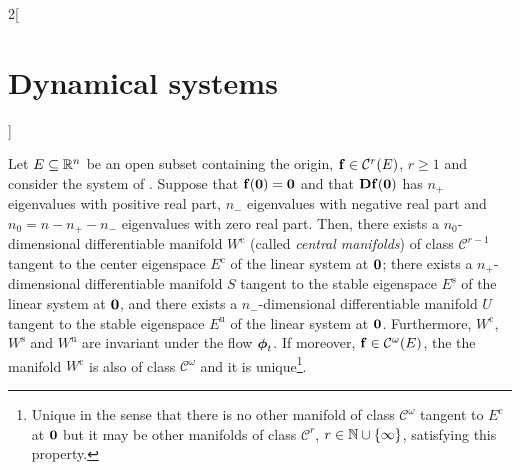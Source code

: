 \documentclass[../../../main_math.tex]{subfiles}
\begin{document}
\begin{multicols}{2}[\section{Dynamical systems}]
\begin{theorem}
    Let $E\subseteq\mathbb{R}^n$ be an open subset containing the origin, $\boldsymbol{\mathrm{f}}\in\mathcal{C}^r(E)$, $r\geq 1$ and consider the system of . Suppose that $\boldsymbol{\mathrm{f}}(\boldsymbol{\mathrm{0}})=\boldsymbol{\mathrm{0}}$ and that $\boldsymbol{\mathrm{Df}}(\boldsymbol{\mathrm{0}})$ has $n_+$ eigenvalues with positive real part, $n_-$ eigenvalues with negative real part and $n_0=n-n_+-n_-$ eigenvalues with zero real part. Then, there exists a $n_0$-dimensional differentiable manifold $W^\text{c}$ (called \emph{central manifolds}) of class $\mathcal{C}^{r-1}$ tangent to the center eigenspace $E^\text{c}$ of the linear system at $\boldsymbol{\mathrm{0}}$; there exists a $n_+$-dimensional differentiable manifold $S$ tangent to the stable eigenspace $E^\text{s}$ of the linear system at $\boldsymbol{\mathrm{0}}$, and there exists a $n_-$-dimensional differentiable manifold $U$ tangent to the stable eigenspace $E^\text{u}$ of the linear system at $\boldsymbol{\mathrm{0}}$. Furthermore, $W^\text{c}$, $W^\text{s}$ and $W^\text{u}$ are invariant under the flow $\boldsymbol{\mathrm{\phi}}_t$. If moreover, $\boldsymbol{\mathrm{f}}\in\mathcal{C}^\omega(E)$, the the manifold $W^\text{c}$ is also of class $\mathcal{C}^{\omega}$ and it is unique\footnote{Unique in the sense that there is no other manifold of class $\mathcal{C}^{\omega}$ tangent to $E^\text{c}$ at $\boldsymbol{\mathrm{0}}$ but it may be other manifolds of class $\mathcal{C}^{r}$, $r\in\mathbb{N}\cup\{\infty\}$, satisfying this property.}.
  \end{theorem}

\end{multicols}
\end{document}
